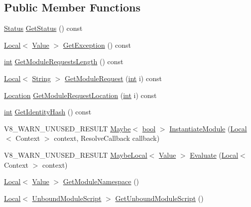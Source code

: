 \subsection*{Public Member Functions}
\begin{DoxyCompactItemize}
\item 
\mbox{\hyperlink{classv8_1_1Module_a9c2a22c9cb8e928d570c38648c648b7e}{Status}} \mbox{\hyperlink{classv8_1_1Module_ae123fe0c62d7e119a98af732f36c1ef4}{Get\+Status}} () const
\item 
\mbox{\hyperlink{classv8_1_1Local}{Local}}$<$ \mbox{\hyperlink{classv8_1_1Value}{Value}} $>$ \mbox{\hyperlink{classv8_1_1Module_a7a48405dcd0e84b6edc78e9b1424bbb4}{Get\+Exception}} () const
\item 
\mbox{\hyperlink{classint}{int}} \mbox{\hyperlink{classv8_1_1Module_a323acfb19889ba4e16b81f1c3d89c2b9}{Get\+Module\+Requests\+Length}} () const
\item 
\mbox{\hyperlink{classv8_1_1Local}{Local}}$<$ \mbox{\hyperlink{classv8_1_1String}{String}} $>$ \mbox{\hyperlink{classv8_1_1Module_adf5a972aa2f814aea5be455ea1076367}{Get\+Module\+Request}} (\mbox{\hyperlink{classint}{int}} i) const
\item 
\mbox{\hyperlink{classv8_1_1Location}{Location}} \mbox{\hyperlink{classv8_1_1Module_a95b5467ac9bcfc120470b6944c7da111}{Get\+Module\+Request\+Location}} (\mbox{\hyperlink{classint}{int}} i) const
\item 
\mbox{\hyperlink{classint}{int}} \mbox{\hyperlink{classv8_1_1Module_aa2966a54ccb783a91ab494407782e9e3}{Get\+Identity\+Hash}} () const
\item 
V8\+\_\+\+W\+A\+R\+N\+\_\+\+U\+N\+U\+S\+E\+D\+\_\+\+R\+E\+S\+U\+LT \mbox{\hyperlink{classv8_1_1Maybe}{Maybe}}$<$ \mbox{\hyperlink{classbool}{bool}} $>$ \mbox{\hyperlink{classv8_1_1Module_a1183f82748a802be435e02a53816b617}{Instantiate\+Module}} (\mbox{\hyperlink{classv8_1_1Local}{Local}}$<$ Context $>$ context, Resolve\+Callback callback)
\item 
V8\+\_\+\+W\+A\+R\+N\+\_\+\+U\+N\+U\+S\+E\+D\+\_\+\+R\+E\+S\+U\+LT \mbox{\hyperlink{classv8_1_1MaybeLocal}{Maybe\+Local}}$<$ \mbox{\hyperlink{classv8_1_1Value}{Value}} $>$ \mbox{\hyperlink{classv8_1_1Module_a1f1758265a4082595757c3251bb40e0f}{Evaluate}} (\mbox{\hyperlink{classv8_1_1Local}{Local}}$<$ Context $>$ context)
\item 
\mbox{\hyperlink{classv8_1_1Local}{Local}}$<$ \mbox{\hyperlink{classv8_1_1Value}{Value}} $>$ \mbox{\hyperlink{classv8_1_1Module_a314c33807e4f3d42a6442ce03c9eabee}{Get\+Module\+Namespace}} ()
\item 
\mbox{\hyperlink{classv8_1_1Local}{Local}}$<$ \mbox{\hyperlink{classv8_1_1UnboundModuleScript}{Unbound\+Module\+Script}} $>$ \mbox{\hyperlink{classv8_1_1Module_ac77824569c55c041a5a97a3e6ec422f3}{Get\+Unbound\+Module\+Script}} ()
\end{DoxyCompactItemize}


